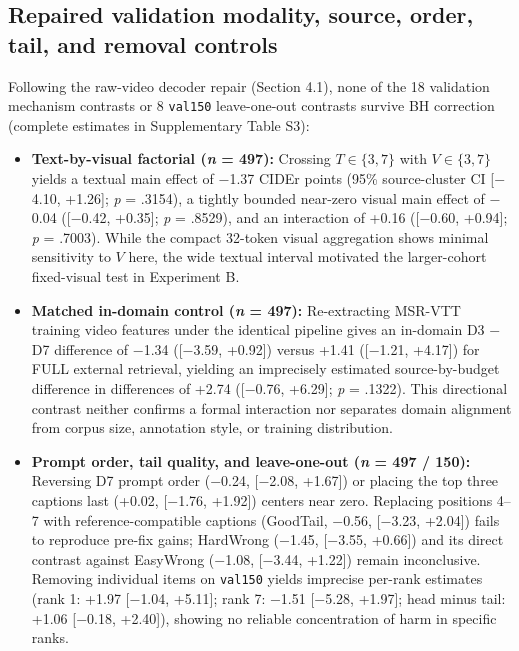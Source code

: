\documentclass[11pt,a4paper]{article}
\begin{document}
\subsection{Repaired validation modality, source, order, tail, and removal controls}
Following the raw-video decoder repair (Section 4.1), none of the 18 validation mechanism contrasts or 8 \texttt{val150} leave-one-out contrasts survive BH correction (complete estimates in Supplementary Table S3):

\begin{itemize}
\item \textbf{Text-by-visual factorial (\emph{n} = 497):} Crossing $T \in \{3, 7\}$ with $V \in \{3, 7\}$ yields a textual main effect of $-$1.37 CIDEr points (95\% source-cluster CI [$-$4.10, +1.26]; \emph{p} = .3154), a tightly bounded near-zero visual main effect of $-$0.04 ([$-$0.42, +0.35]; \emph{p} = .8529), and an interaction of +0.16 ([$-$0.60, +0.94]; \emph{p} = .7003). While the compact 32-token visual aggregation shows minimal sensitivity to $V$ here, the wide textual interval motivated the larger-cohort fixed-visual test in Experiment B.
\item \textbf{Matched in-domain control (\emph{n} = 497):} Re-extracting MSR-VTT training video features under the identical pipeline gives an in-domain D3 $-$ D7 difference of $-$1.34 ([$-$3.59, +0.92]) versus +1.41 ([$-$1.21, +4.17]) for FULL external retrieval, yielding an imprecisely estimated source-by-budget difference in differences of +2.74 ([$-$0.76, +6.29]; \emph{p} = .1322). This directional contrast neither confirms a formal interaction nor separates domain alignment from corpus size, annotation style, or training distribution.
\item \textbf{Prompt order, tail quality, and leave-one-out (\emph{n} = 497 / 150):} Reversing D7 prompt order ($-$0.24, [$-$2.08, +1.67]) or placing the top three captions last (+0.02, [$-$1.76, +1.92]) centers near zero. Replacing positions 4--7 with reference-compatible captions (GoodTail, $-$0.56, [$-$3.23, +2.04]) fails to reproduce pre-fix gains; HardWrong ($-$1.45, [$-$3.55, +0.66]) and its direct contrast against EasyWrong ($-$1.08, [$-$3.44, +1.22]) remain inconclusive. Removing individual items on \texttt{val150} yields imprecise per-rank estimates (rank 1: +1.97 [$-$1.04, +5.11]; rank 7: $-$1.51 [$-$5.28, +1.97]; head minus tail: +1.06 [$-$0.18, +2.40]), showing no reliable concentration of harm in specific ranks.
\end{itemize}
\end{document}
